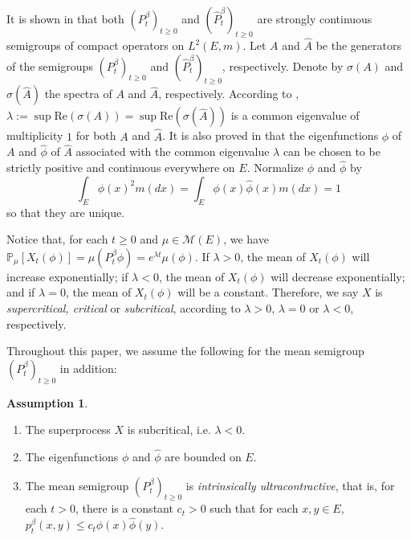 \documentclass[12pt,a4paper]{amsart}
\numberwithin{equation}{section}
\theoremstyle{plain}
\theoremstyle{definition}
\newtheorem{asp}{Assumption}
\begin{document}
It is shown in \cite{RenSongZhang2015Limit, RenSongZhang2017Central} that both
$(P^\beta_t)_{t \geq 0}$ and $(\widehat P_t^{\beta})_{t\geq 0}$ are strongly
continuous semigroups of compact operators on $L^2(E,m)$. Let $A$ and $\widehat
A$ be the generators of the semigroups $(P^\beta_t)_{t \geq 0}$ and $(\widehat
P^\beta_t)_{t \geq 0}$, respectively. Denote by $\sigma(A)$ and $\sigma(\widehat
A)$ the spectra of $A$ and $\widehat A$, respectively. According to
\cite[Theorem V.6.6]{Schaefer1974Banach}, $\lambda := \sup \text{Re}(\sigma(A))
= \sup \text{Re}(\sigma(\widehat A))$ is a common eigenvalue of multiplicity $1$
for both $A$ and $\widehat A$. It is also proved in
\cite{RenSongZhang2015Limit,RenSongZhang2017Central} that the eigenfunctions
$\phi$ of $A$ and $\widehat\phi$ of $\widehat A$ associated with the common
eigenvalue $\lambda$ can be chosen to be strictly positive and continuous
everywhere on $E$. Normalize $\phi$ and $\widehat\phi$ by
\[	
	\int_E \phi(x)^2 m(dx) = \int_E \phi(x) \widehat \phi(x) m(dx) = 1
\]
so that they are unique.
\par
Notice that, for each $t \geq 0$ and $\mu \in \mathcal M(E)$, we have $ \mathbb
P_\mu[X_t(\phi)] = \mu(P^\beta_t \phi) = e^{\lambda t} \mu(\phi). $ If $\lambda
> 0$, the mean of $X_t(\phi)$ will increase exponentially; if $\lambda < 0$, the
mean of $X_t(\phi)$ will decrease exponentially; and if $\lambda = 0$, the mean
of $X_t(\phi)$ will be a constant. Therefore, we say $X$ is \emph{supercritical,
  critical} or \emph{subcritical}, according to $\lambda > 0$, $\lambda = 0$ or
$\lambda < 0$, respectively.
\par
Throughout this paper, we assume the following for the mean semigroup
$(P_t^\beta)_{t\geq 0}$ in addition:
\begin{asp} ~
\label{asp:IU}
\begin{enumerate}
\item The superprocess $X$ is subcritical, i.e. $\lambda < 0$.
\item The eigenfunctions $\phi$ and $\widehat\phi$ are bounded on $E$.
\item \label{subasp:IU} 
  The mean semigroup $(P_t^\beta)_{t\geq 0}$ is \emph{intrinsically ultracontractive}, that is, for each $t>0$, there is a constant $c_t >0$ such that for each $x,y\in E$, $p^\beta_t(x,y) \leq c_t \phi(x) \widehat\phi(y)$.
\end{enumerate}
\end{asp}
\end{document}
